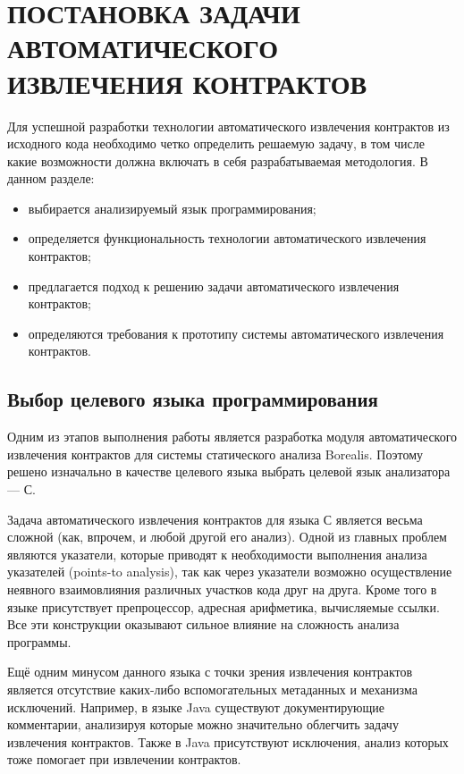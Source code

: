 \chapter{ПОСТАНОВКА ЗАДАЧИ АВТОМАТИЧЕСКОГО ИЗВЛЕЧЕНИЯ КОНТРАКТОВ}
\label{chapter:task}
Для успешной разработки технологии автоматического извлечения контрактов из исходного кода необходимо четко определить решаемую задачу, в том числе какие возможности должна включать в себя разрабатываемая методология. В данном разделе:
\begin{itemize}
\item выбирается анализируемый язык программирования;
\item определяется функциональность технологии автоматического извлечения контрактов;
\item предлагается подход к решению задачи автоматического извлечения контрактов;
\item определяются требования к прототипу системы автоматического извлечения контрактов.
\end{itemize}

\section{Выбор целевого языка программирования}
Одним из этапов выполнения работы является разработка модуля автоматического извлечения контрактов для системы статического анализа Borealis\cite{borealis}. Поэтому решено изначально в качестве целевого языка выбрать целевой язык анализатора --- С\cite{languageC}.

Задача автоматического извлечения контрактов для языка С является весьма сложной (как, впрочем, и любой другой его анализ). Одной из главных проблем являются указатели, которые приводят к необходимости выполнения анализа указателей (points-to analysis), так как через указатели возможно осуществление неявного взаимовлияния различных участков кода друг на друга. Кроме того в языке присутствует препроцессор, адресная арифметика, вычисляемые ссылки. Все эти конструкции оказывают сильное влияние на сложность анализа программы.

Ещё одним минусом данного языка с точки зрения извлечения контрактов является отсутствие каких-либо вспомогательных метаданных и механизма исключений. Например, в языке Java\cite{languageJava} существуют документирующие комментарии, анализируя которые можно значительно облегчить задачу извлечения контрактов. Также в Java присутствуют исключения, анализ которых тоже помогает при извлечении контрактов.

